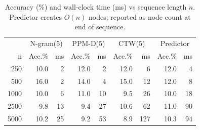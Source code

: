 \begin{table}[h]
\centering
\caption{Accuracy (\%) and wall-clock time (ms) vs sequence length $n$. Predictor creates $O(n)$ nodes; reported as node count at end of sequence.}
\label{tab:scaling}
\begin{tabular}{rrrrrrrrr}
\toprule
 & \multicolumn{2}{c}{N-gram(5)} & \multicolumn{2}{c}{PPM-D(5)} & \multicolumn{2}{c}{CTW(5)} & \multicolumn{2}{c}{Predictor} \\
n & Acc.\% & ms & Acc.\% & ms & Acc.\% & ms & Acc.\% & ms \\
\midrule
250 & 10.0 & 2 & 12.0 & 2 & 12.0 & 6 & 12.0 & 4 \\
500 & 16.0 & 2 & 14.0 & 4 & 15.0 & 12 & 12.0 & 8 \\
1000 & 10.0 & 6 & 11.0 & 10 & 9.5 & 26 & 10.0 & 18 \\
2500 & 9.8 & 13 & 9.4 & 27 & 10.6 & 62 & 11.0 & 90 \\
5000 & 10.2 & 25 & 9.2 & 53 & 8.9 & 127 & 10.3 & 94 \\
\bottomrule
\end{tabular}
\end{table}
